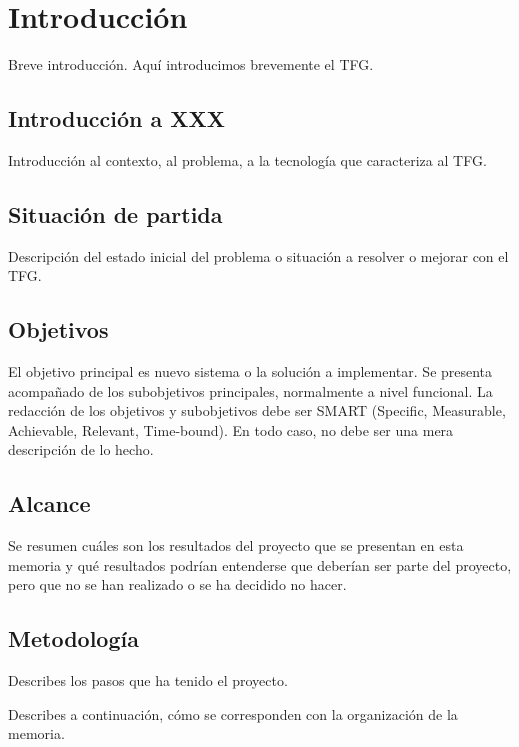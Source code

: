 \documentclass[a4paper,12pt]{report}
\begin{document}
\newpage
{}
\setcounter{page}{1}


\chapter{Introducción}

Breve introducción. Aquí introducimos brevemente el \gls{TFG}. 

\section{Introducción a XXX}

Introducción al contexto, al problema, a la tecnología que caracteriza al TFG.

\section{Situación de partida}

Descripción del estado inicial del problema o situación a resolver o mejorar con el TFG.

\section{Objetivos}

El objetivo principal es nuevo sistema o la solución a implementar. 
Se presenta acompañado de los subobjetivos principales, normalmente a nivel funcional.
La redacción de los objetivos y subobjetivos debe ser SMART (Specific, Measurable, Achievable, Relevant, Time-bound).
En todo caso, no debe ser una mera descripción de lo hecho. 

\section{Alcance}

Se resumen cuáles son los resultados del proyecto que se presentan en esta memoria 
y qué resultados podrían entenderse que deberían ser parte del proyecto, pero que 
no se han realizado o se ha decidido no hacer.

\section{Metodología}

Describes los pasos que ha tenido el proyecto.

Describes a continuación, 
cómo se corresponden con la organización de la memoria.
\end{document}
